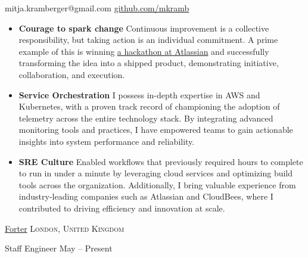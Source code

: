 \documentclass[10pt,a4paper]{article}
\begin{document}
\sloppy  %


\nobreakvspace{0.3em}  %

\noindent
mitja.kramberger@gmail.com\sbull
\href{http://github.com/mkramb}{github.com/mkramb}

\spacedhrule{0.9em}{-0.4em}  %



\begin{indentsection}
\item
\begin{itemize}[leftmargin=0cm]
    \item \textbf{Courage to spark change} Continuous improvement is a collective responsibility, but taking action is an individual commitment. A prime example of this is winning {\href{https://youtu.be/gdmrfGAZB0g?t=415}{a hackathon at Atlassian}} and successfully transforming the idea into a shipped product, demonstrating initiative, collaboration, and execution.
    \item \textbf{Service Orchestration} I possess in-depth expertise in AWS and Kubernetes, with a proven track record of championing the adoption of telemetry across the entire technology stack. By integrating advanced monitoring tools and practices, I have empowered teams to gain actionable insights into system performance and reliability.
    \item \textbf{SRE Culture} Enabled workflows that previously required hours to complete to run in under a minute by leveraging cloud services and optimizing build tools across the organization. Additionally, I bring valuable experience from industry-leading companies such as Atlassian and CloudBees, where I contributed to driving efficiency and innovation at scale.
\end{itemize}
\end{indentsection}

\spacedhrule{0.9em}{-0.4em} 



\headedsection
  {\href{https://froter.com/}{Forter}}
  {\textsc{London, United Kingdom}} {%

  \headedsubsection
    {Staff Engineer}
    {May  -- Present}
    {}
}
\end{document}
